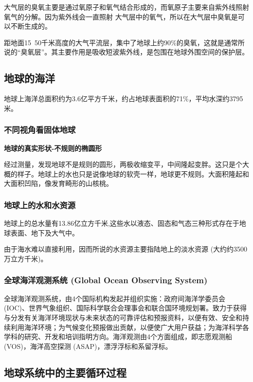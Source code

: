 \documentclass[12pt,a4paper]{article}
\begin{document}
	大气层的臭氧主要是通过氧原子和氧气结合形成的，而氧原子主要来自紫外线照射氧气的分解。因为紫外线会一直照射
	大气层中的氧气，所以在大气层中臭氧是可以不断生成的。
	
	距地面15~50千米高度的大气平流层，集中了地球上约90\%的臭氧，这就是通常所说的“臭氧层”。其主要作用是吸收短波紫外线，是包围在地球外围空间的保护层。
	
	\subsection{地球的海洋}
	
	地球上海洋总面积约为3.6亿平方千米，约占地球表面积的71\%，平均水深约3795米。
	
	\subsubsection{不同视角看固体地球}
	\textbf{地球的真实形状-不规则的椭圆形}
	
	经过测量，发现地球不是规则的圆形，两极收缩变平，中间隆起变胖。这只是个大概的样子。地球上的水也只是说像地球的软壳一样，地球更不规则。大面积隆起和大面积凹陷，像发育畸形的山核桃。
	
	\subsubsection{地球上的水和水资源}
	
	地球上的总水量有13.86亿立方千米,这些水以液态、固态和气态三种形式存在于地球表面、地下及大气中。
	
	由于海水难以直接利用，因而所说的水资源主要指陆地上的淡水资源 (大约约3500万立方千米)。
	
	\subsubsection{全球海洋观测系统 (Global Ocean Observing System)}
	
	全球海洋观测系统，由4个国际机构发起并组织实施：政府间海洋学委员会 (IOC)、世界气象组织、国际科学联合会理事会和联合国环境规划署。致力于获得与分发有关海洋环境现状与未来状态的可靠评估和预报资料，以便有效、安全和持续利用海洋环境；为气候变化预报做出贡献，以便使广大用户获益；为海洋科学各学科的研究、开发和培训指明方向。海洋观测由4个方面组成，即志愿观测船 (VOS)，海洋高空探测 (ASAP)，漂浮浮标和系留浮标。
	
	\subsection{地球系统中的主要循环过程}
	
\end{document}
